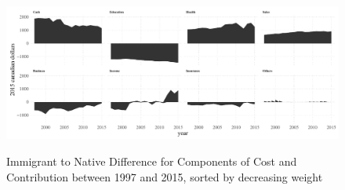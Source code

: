       \begin{figure}[H]%
        \caption{Immigrant to Native Difference for Components of Cost and Contribution between 1997 and 2015, sorted by decreasing weight}
        \includegraphics[width=1\textwidth]{./res/wgtComp.pdf}%
        \label{fig:wgtComp}%
    \end{figure}%
